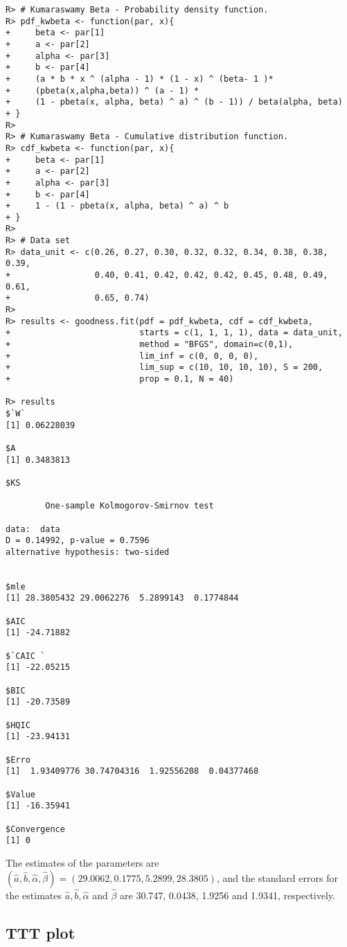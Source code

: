\documentclass[10pt,letterpaper]{article}
\begin{document}
\begin{verbatim}
R> # Kumaraswamy Beta - Probability density function.
R> pdf_kwbeta <- function(par, x){
+     beta <- par[1]
+     a <- par[2]
+     alpha <- par[3]
+     b <- par[4]
+     (a * b * x ^ (alpha - 1) * (1 - x) ^ (beta- 1 )*
+     (pbeta(x,alpha,beta)) ^ (a - 1) *
+     (1 - pbeta(x, alpha, beta) ^ a) ^ (b - 1)) / beta(alpha, beta)
+ }
R>
R> # Kumaraswamy Beta - Cumulative distribution function.
R> cdf_kwbeta <- function(par, x){
+     beta <- par[1]
+     a <- par[2]
+     alpha <- par[3]
+     b <- par[4]
+     1 - (1 - pbeta(x, alpha, beta) ^ a) ^ b
+ }
R>
R> # Data set
R> data_unit <- c(0.26, 0.27, 0.30, 0.32, 0.32, 0.34, 0.38, 0.38, 0.39,
+                 0.40, 0.41, 0.42, 0.42, 0.42, 0.45, 0.48, 0.49, 0.61,
+                 0.65, 0.74)
R>
R> results <- goodness.fit(pdf = pdf_kwbeta, cdf = cdf_kwbeta,
+                          starts = c(1, 1, 1, 1), data = data_unit,
+                          method = "BFGS", domain=c(0,1),
+                          lim_inf = c(0, 0, 0, 0),
+                          lim_sup = c(10, 10, 10, 10), S = 200,
+                          prop = 0.1, N = 40)

R> results
$`W`
[1] 0.06228039

$A
[1] 0.3483813

$KS

        One-sample Kolmogorov-Smirnov test

data:  data
D = 0.14992, p-value = 0.7596
alternative hypothesis: two-sided


$mle
[1] 28.3805432 29.0062276  5.2899143  0.1774844

$AIC
[1] -24.71882

$`CAIC `
[1] -22.05215

$BIC
[1] -20.73589

$HQIC
[1] -23.94131

$Erro
[1]  1.93409776 30.74704316  1.92556208  0.04377468

$Value
[1] -16.35941

$Convergence
[1] 0
\end{verbatim}

The estimates of the parameters are
$(\widehat{a},\widehat{b},\widehat{\alpha},\widehat{\beta}) = (29.0062, 0.1775, 5.2899, 28.3805)$, and
the standard errors for the estimates $\widehat{a}, \widehat{b}, \widehat{\alpha}$ and $\widehat{\beta}$
are 30.747, 0.0438, 1.9256 and 1.9341, respectively.


\subsection{TTT plot}
\end{document}
